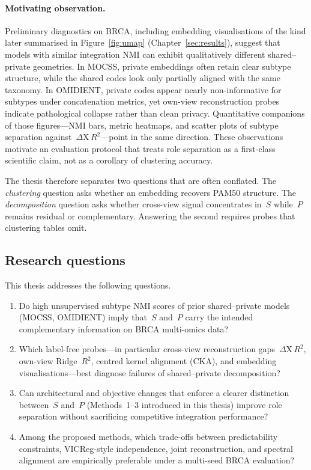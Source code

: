 \paragraph{Motivating observation.}
Preliminary diagnostics on BRCA, including embedding visualisations of the kind later summarised in Figure~\ref{fig:umap} (Chapter~\ref{sec:results}), suggest that models with similar integration NMI can exhibit qualitatively different shared--private geometries. In MOCSS, private embeddings often retain clear subtype structure, while the shared codes look only partially aligned with the same taxonomy. In OMIDIENT, private codes appear nearly non-informative for subtypes under concatenation metrics, yet own-view reconstruction probes indicate pathological collapse rather than clean privacy. Quantitative companions of those figures---NMI bars, metric heatmaps, and scatter plots of subtype separation against~$\Delta\mathrm{X}\,R^{2}$---point in the same direction. These observations motivate an evaluation protocol that treats role separation as a first-class scientific claim, not as a corollary of clustering accuracy.

The thesis therefore separates two questions that are often conflated. The \emph{clustering} question asks whether an embedding recovers PAM50 structure. The \emph{decomposition} question asks whether cross-view signal concentrates in~$S$ while~$P$ remains residual or complementary. Answering the second requires probes that clustering tables omit.

\subsection{Research questions}

This thesis addresses the following questions.

\begin{enumerate}
\item Do high unsupervised subtype NMI scores of prior shared--private models (MOCSS, OMIDIENT) imply that~$S$ and~$P$ carry the intended complementary information on BRCA multi-omics data?
\item Which label-free probes---in particular cross-view reconstruction gaps~$\Delta\mathrm{X}\,R^{2}$, own-view Ridge~$R^{2}$, centred kernel alignment (CKA), and embedding visualisations---best diagnose failures of shared--private decomposition?
\item Can architectural and objective changes that enforce a clearer distinction between~$S$ and~$P$ (Methods~1--3 introduced in this thesis) improve role separation without sacrificing competitive integration performance?
\item Among the proposed methods, which trade-offs between predictability constraints, VICReg-style independence, joint reconstruction, and spectral alignment are empirically preferable under a multi-seed BRCA evaluation?
\end{enumerate}

